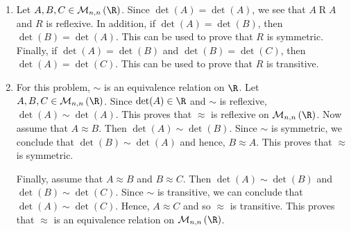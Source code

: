 \begin{enumerate}
\begin{enumerate}
\item Let $A, B, C \in \mathcal{M}_{n, n}\left( \R \right)$.  Since $\det(A) = \det(A)$, we see that $A \mathrel{R} A$ and $R$ is reflexive.  In addition, if $\det(A) = \det(B)$, then $\det(B) = \det(A)$.  This can be used to prove that $R$ is symmetric.  Finally, if 
$\det(A) = \det(B)$ and $\det(B) = \det(C)$, then $\det(A) = \det(C)$.  This can be used to prove that $R$ is transitive.

\item For this problem, $\sim$ is an equivalence relation on $\R$. Let $A, B, C \in \mathcal{M}_{n, n}\left( \R \right)$.  Since $\det(A) \in \R$ and $\sim$ is reflexive, 
$\det(A) \sim \det(A)$.  This proves that $\approx$ is reflexive on 
$\mathcal{M}_{n, n}\left( \R \right)$.  Now assume that $A \approx B$.  Then $\det(A) \sim \det(B)$.  Since $\sim$ is symmetric, we conclude that $\det(B) \sim \det(A)$ and hence, 
$B \approx A$.  This proves that $\approx$ is symmetric.

Finally, assume that $A \approx B$ and $B \approx C$.  Then $\det(A) \sim \det(B)$ and 
$\det(B) \sim \det(C)$.  Since $\sim$ is transitive, we can conclude that 
$\det(A) \sim \det(C)$.  Hence, $A \approx C$ and so $\approx$ is transitive.  This proves that $\approx$ is an equivalence relation on $\mathcal{M}_{n, n}\left( \R \right)$.
\end{enumerate}

\end{enumerate}
\hbreak
\endinput
